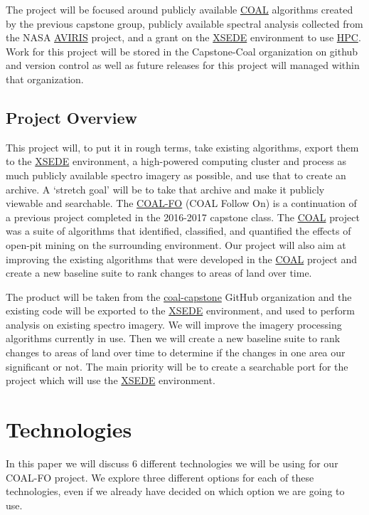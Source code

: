 \documentclass[10pt,draftclsnofoot,onecolumn,journal,compsoc]{IEEEtran}
\begin{document}
\noindent The project will be focused around publicly available \href{https://capstone-coal.github.io/}{COAL} algorithms created by the previous capstone group, publicly available spectral analysis collected from the NASA \href{https://aviris.jpl.nasa.gov/}{AVIRIS} project, and a grant on the \href{https://www.xsede.org/}{XSEDE} environment to use \href{https://en.wikipedia.org/wiki/Supercomputer}{HPC}. Work for this project will be stored in the Capstone-Coal organization on github and version control as well as future releases for this project will managed within that organization.

\subsection{Project Overview}

\noindent This project will, to put it in rough terms, take existing algorithms, export them to the \href{https://www.xsede.org/}{XSEDE} environment, a high-powered computing cluster and process as much publicly available spectro imagery as possible, and use that to create an archive. A ‘stretch goal’ will be to take that archive and make it publicly viewable and searchable. The \href{http://eecs.oregonstate.edu/capstone/cs/capstone.cgi?project=320}{COAL-FO} (COAL Follow On) is a continuation of a previous project completed in the 2016-2017 capstone class. The \href{https://capstone-coal.github.io/}{COAL} project was a suite of algorithms that identified, classified, and quantified the effects of open-pit mining on the surrounding environment. Our project will also aim at improving the existing algorithms that were developed in the \href{https://capstone-coal.github.io/}{COAL} project and create a new baseline suite to rank changes to areas of land over time. \newline

\noindent The product will be taken from the \href{https://capstone-coal.github.io/}{coal-capstone} GitHub organization and the existing code will be exported to the \href{https://www.xsede.org/}{XSEDE} environment, and used to perform analysis on existing spectro imagery. We will improve the imagery processing algorithms currently in use. Then we will create a new baseline suite to rank changes to areas of land over time to determine if the changes in one area our significant or not. The main priority will be to create a searchable port for the project which will use the \href{https://www.xsede.org/}{XSEDE} environment.

\section{Technologies}
In this paper we will discuss 6 different technologies we will be using for our COAL-FO project. We explore three different options for each of these technologies, even if we already have decided on which option we are going to use.
\end{document}
